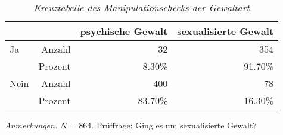 \begin{table}[htb]
    \caption[Kreuztabelle Manipulationscheck Gewaltart]{\textit {Kreuztabelle des Manipulationschecks der Gewaltart}} 
    \label{KT_G}
    \centering
    \begin{adjustbox}{width=10cm} %
    \small
    \begin{tabular}{lrrr}
      \hline
        &   & psychische Gewalt & sexualisierte Gewalt \\
      \hline
    Ja   & Anzahl  & 32      & 354     \\
         & Prozent & 8.30\%  & 91.70\% \\
    Nein & Anzahl  & 400     & 78      \\
         & Prozent & 83.70\% & 16.30\% \\
       \hline
    \end{tabular}
    \end{adjustbox}
    
    \begin{tablenotes}
        \item \textit{Anmerkungen.} \( N \) = 864. Prüffrage: Ging es um sexualisierte Gewalt?
      \end{tablenotes}
    \end{table}